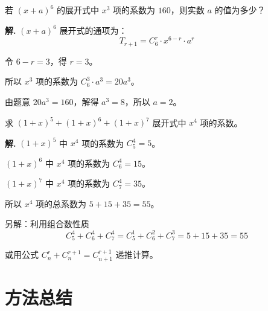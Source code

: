 \documentclass[11pt]{ctexrep}
\begin{document}
\begin{realexam}[2025 上海高三二模]
    若 $(x + a)^6$ 的展开式中 $x^3$ 项的系数为 $160$，则实数 $a$ 的值为多少？
\end{realexam}

\textbf{解.} $(x + a)^6$ 展开式的通项为：
\[
    T_{r+1} = C_6^r \cdot x^{6-r} \cdot a^r
\]

令 $6 - r = 3$，得 $r = 3$。

所以 $x^3$ 项的系数为 $C_6^3 \cdot a^3 = 20a^3$。

由题意 $20a^3 = 160$，解得 $a^3 = 8$，所以 $a = 2$。

\begin{realexam}[练习]
    求 $(1 + x)^5 + (1 + x)^6 + (1 + x)^7$ 展开式中 $x^4$ 项的系数。
\end{realexam}

\textbf{解.} $(1 + x)^5$ 中 $x^4$ 项的系数为 $C_5^4 = 5$。

$(1 + x)^6$ 中 $x^4$ 项的系数为 $C_6^4 = 15$。

$(1 + x)^7$ 中 $x^4$ 项的系数为 $C_7^4 = 35$。

所以 $x^4$ 项的总系数为 $5 + 15 + 35 = 55$。

另解：利用组合数性质
\[
    C_5^4 + C_6^4 + C_7^4 = C_5^1 + C_6^2 + C_7^3 = 5 + 15 + 35 = 55
\]

或用公式 $C_n^r + C_n^{r+1} = C_{n+1}^{r+1}$ 递推计算。

\section*{方法总结}
\end{document}
